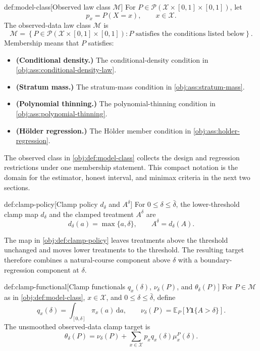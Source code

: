 \documentclass[11pt]{article}
\begin{document}
\begin{definitionv}{def:model-class}[Observed law class \(\mathcal M\)]
For \(P\in\mathcal P(\mathcal X\times[0,1]\times[0,1])\), let
\[
p_x=P(X=x),
\qquad x\in\mathcal X .
\]
The observed-data law class \(\mathcal M\) is
\[
\mathcal M
=
\left\{
P\in\mathcal P(\mathcal X\times[0,1]\times[0,1])
:
P\text{ satisfies the conditions listed below}
\right\}.
\]
Membership means that \(P\) satisfies:
\begin{itemize}
\item \textbf{(Conditional density.)} The conditional-density condition in \cref{obj:ass:conditional-density-law}.
\item \textbf{(Stratum mass.)} The stratum-mass condition in \cref{obj:ass:stratum-mass}.
\item \textbf{(Polynomial thinning.)} The polynomial-thinning condition in \cref{obj:ass:polynomial-thinning}.
\item \textbf{(Hölder regression.)} The Hölder member condition in \cref{obj:ass:holder-regression}.
\end{itemize}
\end{definitionv}

The observed class  in \cref{obj:def:model-class} collects the design and regression restrictions under one membership statement. This compact notation is the domain for the estimator, honest interval, and minimax criteria in the next two sections.

\begin{definitionv}{def:clamp-policy}[Clamp policy \(d_\delta\) and \(A^\delta\)]
For \(0\leq\delta\leq\bar\delta\), the lower-threshold clamp map \(d_\delta\) and the clamped treatment \(A^\delta\) are
\[
d_\delta(a)=\max\{a,\delta\},
\qquad
A^\delta=d_\delta(A).
\]
\end{definitionv}

The map  in \cref{obj:def:clamp-policy} leaves treatments above the threshold unchanged and moves lower treatments to the threshold. The resulting target therefore combines a natural-course component above \(\delta\) with a boundary-regression component at \(\delta\).

\begin{definitionv}{def:clamp-functional}[Clamp functionals \(q_x(\delta)\), \(\nu_\delta(P)\), and \(\theta_\delta(P)\)]
For \(P\in\mathcal M\) as in \cref{obj:def:model-class}, \(x\in\mathcal X\), and \(0\leq\delta\leq\bar\delta\), define
\[
q_x(\delta)=\int_{[0,\delta]}\pi_x(a)\,\mathrm da,
\qquad
\nu_\delta(P)=\mathbb E_P\!\left[Y\mathbf 1\{A>\delta\}\right].
\]
The unsmoothed observed-data clamp target is
\[
\theta_\delta(P)
=
\nu_\delta(P)
+
\sum_{x\in\mathcal X}p_xq_x(\delta)\mu_x^P(\delta).
\]
\end{definitionv}
\end{document}
